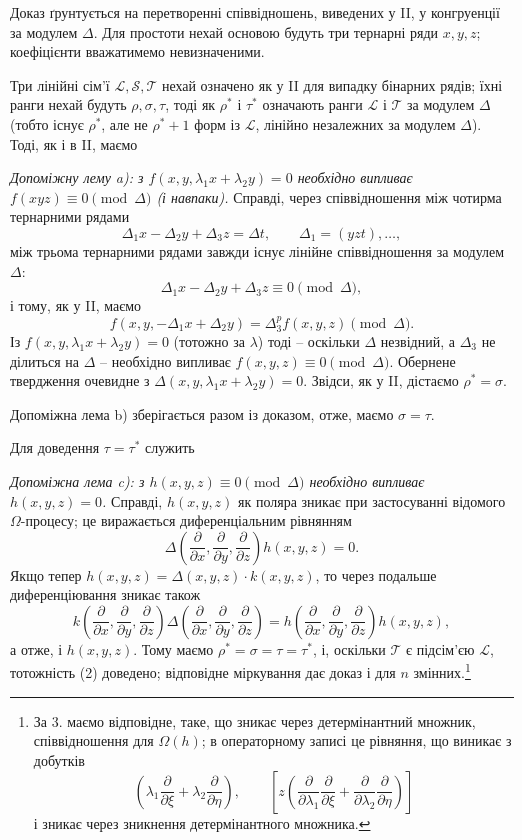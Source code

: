 \documentclass[11pt]{article}
\begin{document}
Доказ ґрунтується на перетворенні співвідношень, виведених у II, у конгруенції за модулем $\Delta$. Для простоти нехай основою будуть три тернарні ряди $x,y,z$; коефіцієнти вважатимемо невизначеними.

Три лінійні сім'ї $\mathcal L,\mathcal S,\mathcal T$ нехай означено як у II для випадку бінарних рядів; їхні ранги нехай будуть $\rho,\sigma,\tau$, тоді як $\rho^*$ і $\tau^*$ означають ранги $\mathcal L$ і $\mathcal T$ за модулем $\Delta$ (тобто існує $\rho^*$, але не $\rho^*+1$ форм із $\mathcal L$, лінійно незалежних за модулем $\Delta$). Тоді, як і в II, маємо

\emph{Допоміжну лему a): з $f(x,y,\lambda_1x+\lambda_2y)=0$ необхідно випливає $f(xyz)\equiv0\pmod{\Delta}$ (і навпаки).} Справді, через співвідношення між чотирма тернарними рядами
\[
  \Delta_1x-\Delta_2y+\Delta_3z=\Delta t,
  \qquad \Delta_1=(yzt),\ldots,
\]
між трьома тернарними рядами завжди існує лінійне співвідношення за модулем $\Delta$:
\[
  \Delta_1x-\Delta_2y+\Delta_3z\equiv0\pmod{\Delta},
\]
і тому, як у II, маємо
\[
  f(x,y,-\Delta_1x+\Delta_2y)=\Delta_3^p f(x,y,z)\pmod{\Delta}.
\]
Із $f(x,y,\lambda_1x+\lambda_2y)=0$ (тотожно за $\lambda$) тоді -- оскільки $\Delta$ незвідний, а $\Delta_3$ не ділиться на $\Delta$ -- необхідно випливає $f(x,y,z)\equiv0\pmod{\Delta}$. Обернене твердження очевидне з $\Delta(x,y,\lambda_1x+\lambda_2y)=0$. Звідси, як у II, дістаємо $\rho^*=\sigma$.

Допоміжна лема b) зберігається разом із доказом, отже, маємо $\sigma=\tau$.

Для доведення $\tau=\tau^*$ служить

\emph{Допоміжна лема c): з $h(x,y,z)\equiv0\pmod{\Delta}$ необхідно випливає $h(x,y,z)=0$.}
Справді, $h(x,y,z)$ як поляра зникає при застосуванні відомого $\Omega$-процесу; це виражається диференціальним рівнянням
\[
  \Delta\!\left(\frac{\partial}{\partial x},\frac{\partial}{\partial y},\frac{\partial}{\partial z}\right)h(x,y,z)=0.
\]
Якщо тепер $h(x,y,z)=\Delta(x,y,z)\cdot k(x,y,z)$, то через подальше диференціювання зникає також
\[
  k\!\left(\frac{\partial}{\partial x},\frac{\partial}{\partial y},\frac{\partial}{\partial z}\right)
  \Delta\!\left(\frac{\partial}{\partial x},\frac{\partial}{\partial y},\frac{\partial}{\partial z}\right)
  =
  h\!\left(\frac{\partial}{\partial x},\frac{\partial}{\partial y},\frac{\partial}{\partial z}\right)h(x,y,z),
\]
а отже, і $h(x,y,z)$. Тому маємо $\rho^*=\sigma=\tau=\tau^*$, і, оскільки $\mathcal T$ є підсім'єю $\mathcal L$, тотожність (2) доведено; відповідне міркування дає доказ і для $n$ змінних.\footnote{За 3. маємо відповідне, таке, що зникає через детермінантний множник, співвідношення для $\Omega(h)$; в операторному записі це рівняння, що виникає з добутків
\[
 \left(\lambda_1\frac{\partial}{\partial \xi}+\lambda_2\frac{\partial}{\partial \eta}\right),
 \qquad
 \left[z\left(\frac{\partial}{\partial\lambda_1}\frac{\partial}{\partial \xi}
 +\frac{\partial}{\partial\lambda_2}\frac{\partial}{\partial \eta}\right)\right]
\]
і зникає через зникнення детермінантного множника.}
\end{document}

